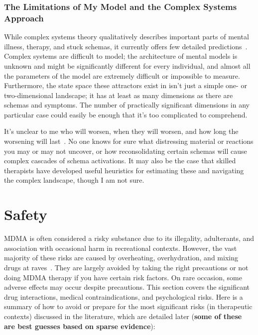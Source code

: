 \documentclass[11pt,oneside]{book}
\let\cite\parencite
\begin{document}
\subsection*{The Limitations of My Model and the Complex Systems Approach}
While complex systems theory qualitatively describes important parts of mental illness, therapy, and stuck schemas, it currently offers few detailed predictions~\cite{hayes2020complex}. Complex systems are difficult to model; the architecture of mental models is unknown and might be significantly different for every individual, and almost all the parameters of the model are extremely difficult or impossible to measure. Furthermore, the state space these attractors exist in isn't just a simple one- or two-dimensional landscape; it has at least as many dimensions as there are schemas and symptoms. The number of practically significant dimensions in any particular case could easily be enough that it's too complicated to comprehend.

It's unclear to me who will worsen, when they will worsen, and how long the worsening will last~\cite{hayes2020complex}. No one knows for sure what distressing material or reactions you may or may not uncover, or how reconsolidating certain schemas will cause complex cascades of schema activations. It may also be the case that skilled therapists have developed useful heuristics for estimating these and navigating the complex landscape, though I am not sure.

\chapter{Safety}
\label{sec:safety}
MDMA is often considered a risky substance due to its illegality, adulterants, and association with occasional harm in recreational contexts. However, the vast majority of these risks are caused by overheating, overhydration, and mixing drugs at raves~\cite{riggDeaths}. They are largely avoided by taking the right precautions or not doing MDMA therapy if you have certain risk factors. On rare occasion, some adverse effects may occur despite precautions. This section covers the significant drug interactions, medical contraindications, and psychological risks. Here is a summary of how to avoid or prepare for the most significant risks (in therapeutic contexts) discussed in the literature, which are detailed later (\textbf{some of these are best guesses based on sparse evidence}):
\end{document}
